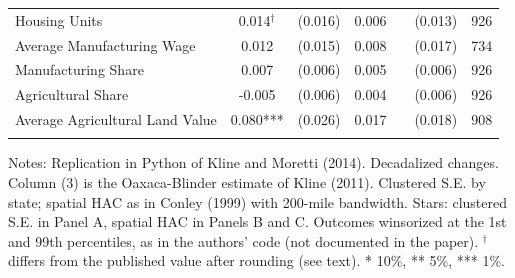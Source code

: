 \begin{table}[htbp]
\begin{tabular}{lcccccc}
Housing Units & 0.014$^\dagger$ & (0.016) & 0.006 &  & (0.013) & 926 \\
Average Manufacturing Wage & 0.012 & (0.015) & 0.008 &  & (0.017) & 734 \\
Manufacturing Share & 0.007 & (0.006) & 0.005 &  & (0.006) & 926 \\
Agricultural Share & -0.005 & (0.006) & 0.004 &  & (0.006) & 926 \\
Average Agricultural Land Value & 0.080*** & (0.026) & 0.017 &  & (0.018) & 908 \\
\addlinespace
\bottomrule
\end{tabular}
\begin{minipage}{0.95\textwidth}\vspace{4pt}\scriptsize Notes: Replication in Python of Kline and Moretti (2014). Decadalized changes. Column (3) is the Oaxaca-Blinder estimate of Kline (2011). Clustered S.E. by state; spatial HAC as in Conley (1999) with 200-mile bandwidth. Stars: clustered S.E. in Panel A, spatial HAC in Panels B and C. Outcomes winsorized at the 1st and 99th percentiles, as in the authors' code (not documented in the paper). $^\dagger$ differs from the published value after rounding (see text). * 10\%, ** 5\%, *** 1\%.\end{minipage}
\end{table}